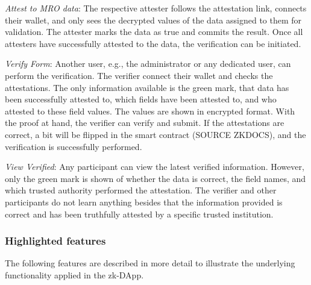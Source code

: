 \textit{Attest to MRO data}: The respective attester follows the attestation link, connects their wallet, and only sees the decrypted values of the data assigned to them for validation. The attester marks the data as true and commits the result. Once all attesters have successfully attested to the data, the verification can be initiated.

\textit{Verify Form}: Another user, e.g., the administrator or any dedicated user, can perform the verification. The verifier connect their wallet and checks the attestations. The only information available is the green mark, that data has been successfully attested to, which fields have been attested to, and who attested to these field values. The values are shown in encrypted format. With the proof at hand, the verifier can verify and submit. If the attestations are correct, a bit will be flipped in the smart contract (SOURCE ZKDOCS), and the verification is successfully performed.

\textit{View Verified}: Any participant can view the latest verified information. However, only the green mark is shown of whether the data is correct, the field names, and which trusted authority performed the attestation. The verifier and other participants do not learn anything besides that the information provided is correct and has been truthfully attested by a specific trusted institution.

\subsubsection{Highlighted features}
The following features are described in more detail to illustrate the underlying functionality applied in the zk-DApp. 

